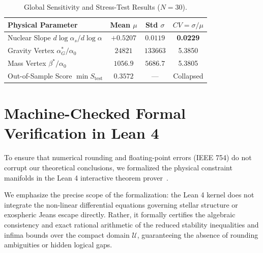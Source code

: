 \documentclass[aps,prd,twocolumn,superscriptaddress,nofootinbib,floatfix]{revtex4-2}
\begin{document}
\begin{table}[t]
\caption{\label{tab:audit}Global Sensitivity and Stress-Test Results ($N=30$).}
\begin{ruledtabular}
\begin{tabular}{lccc}
Physical Parameter & Mean $\mu$ & Std $\sigma$ & $CV = \sigma/\mu$ \\
\hline
Nuclear Slope $d\log\alpha_s / d\log\alpha$ & $+0.5207$ & $0.0119$ & \textbf{0.0229} \\
Gravity Vertex $\alpha_G^* / \alpha_0$ & $24821$ & $133663$ & 5.3850 \\
Mass Vertex $\beta^* / \alpha_0$ & $1056.9$ & $5686.7$ & 5.3805 \\
Out-of-Sample Score $\min S_{\text{test}}$ & $0.3572$ & --- & Collapsed \\
\end{tabular}
\end{ruledtabular}
\end{table}

\section{Machine-Checked Formal Verification in Lean 4}
\label{sec:formal}

To ensure that numerical rounding and floating-point errors (IEEE 754) do not corrupt our theoretical conclusions, we formalized the physical constraint manifolds in the Lean 4 interactive theorem prover~\cite{Moura2021}. 

We emphasize the precise scope of the formalization: the Lean 4 kernel does not integrate the non-linear differential equations governing stellar structure or exospheric Jeans escape directly. Rather, it formally certifies the algebraic consistency and exact rational arithmetic of the reduced stability inequalities and infima bounds over the compact domain $\mathcal{U}$, guaranteeing the absence of rounding ambiguities or hidden logical gaps.
\end{document}
